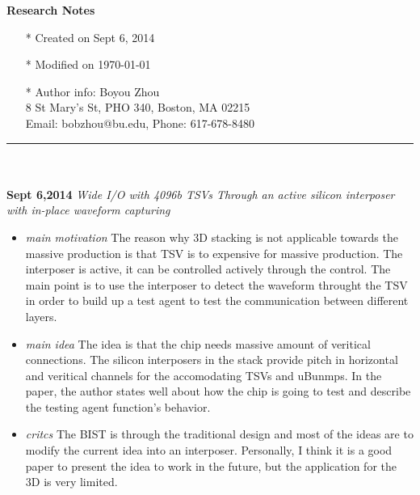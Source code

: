 \documentclass[]{article}
\begin{document}
\pagestyle{empty}
{\large\textbf{Research Notes}}
\begin{itemize}
    \item[*] Created on Sept 6, 2014
    \item[*] Modified on \today
    \item[*] Author info: Boyou Zhou\\
             8 St Mary's St, PHO 340, Boston, MA 02215\\
             Email: bobzhou@bu.edu, Phone: 617-678-8480
\end{itemize}


\rule[-0.1cm]{7.5in}{0.01cm}\\
\\
\noindent \textbf{Sept 6,2014}
\textit{Wide I/O with 4096b TSVs Through an active silicon interposer with in-place waveform capturing}
\indent		\begin{itemize}
            \item \textit{main motivation} The reason why 3D stacking is not applicable towards the massive production is that TSV is to expensive for massive production.
            The interposer is active, it can be controlled actively through the control. 
            The main point is to use the interposer to detect the waveform throught the TSV in order to build up a test agent to test the communication between different layers.
            \item \textit{main idea} The idea is that the chip needs massive amount of veritical connections.
            The silicon interposers in the stack provide pitch in horizontal and veritical channels for the accomodating TSVs and uBunmps.
            In the paper, the author states well about how the chip is going to test and describe the testing agent function's behavior.
            \item \textit{critcs} The BIST is through the traditional design and most of the ideas are to modify the current idea into an interposer.
            Personally, I think it is a good paper to present the idea to work in the future, but the application for the 3D is very limited.
        \end{itemize}
\end{document}
